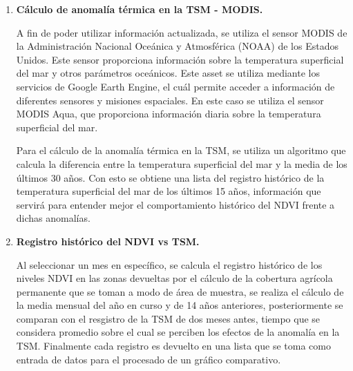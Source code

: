 \begin{enumerate}[label=\thesubsection.\arabic*, leftmargin=1.5cm]
      Esta información se encuentra disponible en formato de texto plano y contiene datos de anomalías térmicas en la temperatura superficial del mar (TSM).

      Para hacer uso de los datos dentro del algoritmo de procesamiento en la aplicación, se desarrolló un proceso basado en la solicitud de datos mediante un script en Python, que realiza la descarga y almacenamiento en un archivo CSV, el cuál se guarda en un repositorio de GitHub. Este archivo CSV es posteriormente inyectado a la plataforma de Google Earth Engine como un asset nuevo. Todo este proceos es automatizado gracias al servicio de GitHub Actions, el cuál permite ejecutar scripts de Python en un intervalo de tiempo determinado. En este caso se ejecuta cada 24 horas, lo que permite mantener la información actualizada.

      \newpage

      \item \textbf{Cálculo de anomalía térmica en la TSM - MODIS.}
      
      A fin de poder utilizar información actualizada, se utiliza el sensor MODIS de la Administración Nacional Oceánica y Atmosférica (NOAA) de los Estados Unidos. Este sensor proporciona información sobre la temperatura superficial del mar y otros parámetros oceánicos. Este asset se utiliza mediante los servicios de Google Earth Engine, el cuál permite acceder a información de diferentes sensores y misiones espaciales. En este caso se utiliza el sensor MODIS Aqua, que proporciona información diaria sobre la temperatura superficial del mar.

      Para el cálculo de la anomalía térmica en la TSM, se utiliza un algoritmo que calcula la diferencia entre la temperatura superficial del mar y la media de los últimos 30 años. Con esto se obtiene una lista del registro histórico de la temperatura superficial del mar de los últimos 15 años, información que servirá para entender mejor el comportamiento histórico del NDVI frente a dichas anomalías.

      \item \textbf{Registro histórico del NDVI vs TSM.}
      
      Al seleccionar un mes en específico, se calcula el registro histórico de los niveles NDVI en las zonas devueltas por el cálculo de la cobertura agrícola permanente que se toman a modo de área de muestra, se realiza el cálculo de la media mensual del año en curso y de 14 años anteriores, posteriormente se comparan con el resgistro de la TSM de dos meses antes, tiempo que se considera promedio sobre el cual se perciben los efectos de la anomalía en la TSM. Finalmente cada registro es devuelto en una lista que se toma como entrada de datos para el procesado de un gráfico comparativo.


\end{enumerate}
